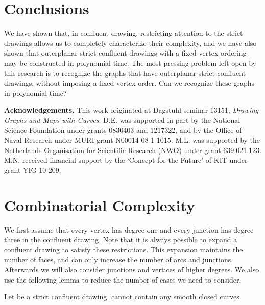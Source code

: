 \documentclass{llncs}
\renewcommand{\paragraph}[1]{\medskip\noindent\textbf{#1.}}
\begin{document}
\section {Conclusions}

We have shown that, in confluent drawing, restricting attention to the strict drawings allows us to completely characterize their complexity, and we have also shown that outerplanar strict confluent drawings with a fixed vertex ordering may be constructed in polynomial time. The most pressing problem left open by this research is to recognize the graphs that have outerplanar strict confluent drawings, without imposing a fixed vertex order. Can we recognize these graphs in polynomial time?

\medskip
\paragraph{Acknowledgements}
This work originated at Dagstuhl seminar 13151, \emph {Drawing Graphs and Maps with Curves}. D.E. was supported in part by the National Science Foundation under grants 0830403 and 1217322, and by the Office of Naval Research under MURI grant N00014-08-1-1015. M.L. was supported by the Netherlands Organisation for Scientific Research (NWO) under grant 639.021.123. M.N. received financial support by the `Concept for the Future' of KIT under grant YIG 10-209.

\small


\normalsize
\appendix\clearpage


\section{Combinatorial Complexity} \label {app:complexity}

We first assume that every vertex has degree one and every junction has degree three in the confluent drawing. Note that it is always possible to expand a confluent drawing to satisfy these restrictions. This expansion maintains the number of faces, and can only increase the number of arcs and junctions. Afterwards we will also consider junctions and vertices of higher degrees.
We also use the following lemma to reduce the number of cases we need to consider.

\begin {lemma} \label {lem:noloops}
  Let  be a strict confluent drawing.  cannot contain any smooth closed curves.
\end {lemma}
\end{document}
